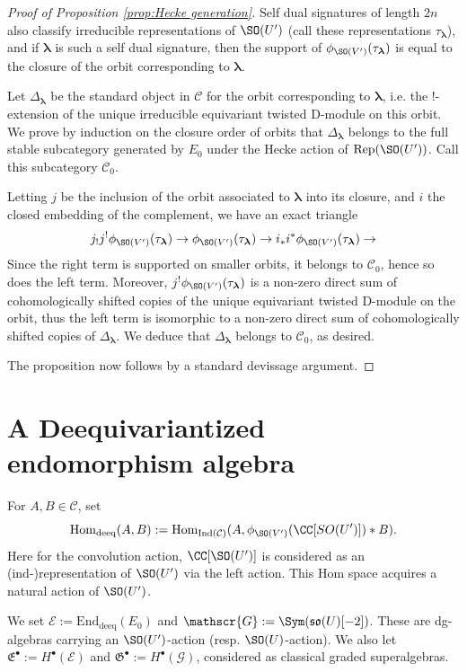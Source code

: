 \documentclass[11pt]{article}
\begin{document}
\begin{proof}[Proof of Proposition \ref{prop:Hecke generation}]
    Self dual signatures of length $2n$ also classify irreducible representations of $\SO(U')$ (call these representations $\tau_{\boldsymbol{\lambda}}$), and if $\boldsymbol{\lambda}$ is such a self dual signature, then the support of $\phi_{\SO(V')}(\tau_{\boldsymbol{\lambda}})$ is equal to the closure of the orbit corresponding to $\boldsymbol{\lambda}$.
    
    Let $\Delta_{\boldsymbol{\lambda}}$ be the standard object in $\mathcal{C}$ for the orbit corresponding to $\boldsymbol{\lambda}$, i.e. the $!$-extension of the unique irreducible equivariant twisted D-module on this orbit. We prove by induction on the closure order of orbits that $\Delta_{\boldsymbol{\lambda}}$ belongs to the full stable subcategory generated by $E_0$ under the Hecke action of $\mathrm{Rep}(\SO(U'))$. Call this subcategory $\mathcal{C}_0$.

    Letting $j$ be the inclusion of the orbit associated to $\boldsymbol{\lambda}$ into its closure, and $i$ the closed embedding of the complement, we have an exact triangle
    $$j_! j^! \phi_{\SO(V')}(\tau_{\boldsymbol{\lambda}}) \to \phi_{\SO(V')}(\tau_{\boldsymbol{\lambda}}) \to i_* i^* \phi_{\SO(V')}(\tau_{\boldsymbol{\lambda}})\to$$
    Since the right term is supported on smaller orbits, it belongs to $\mathcal{C}_0$, hence so does the left term.
    Moreover, $j^! \phi_{\SO(V')}(\tau_{\boldsymbol{\lambda}})$ is a non-zero direct sum of cohomologically shifted copies of the unique equivariant twisted D-module on the orbit, thus the left term is isomorphic to a non-zero direct sum of cohomologically shifted copies of $\Delta_{\boldsymbol{\lambda}}$. We deduce that $\Delta_{\boldsymbol{\lambda}}$ belongs to $\mathcal{C}_0$, as desired.

    The proposition now follows by a standard devissage argument.
\end{proof}

\section{A Deequivariantized endomorphism algebra}\label{sec: deeq}
\begin{definition}\label{def: deeq}
    For $A,B\in \mathcal{C}$, set
    $$\mathrm{Hom}_{\mathrm{deeq}}(A,B):=\mathrm{Hom}_{\mathrm{Ind}(\mathcal{C})}(A, \phi_{\SO(V')}(\CC[SO(U')])*B).$$
Here for the convolution action, $\CC[\SO(U')]$ is considered as an (ind-)representation of $\SO(U')$ via the left action. This Hom space acquires a natural action of $\SO(U')$.
\end{definition}
We set $\mathscr{E}:=\mathrm{End}_{\mathrm{deeq}}(E_0)$ and $\mathscr{G}:=\Sym(\mathfrak{so}(U)[-2])$.
These are dg-algebras carrying an $\SO(U')$-action (resp. $\SO(U)$-action).
We also let $\mathfrak{E}^\bullet:=H^\bullet(\mathscr{E})$ and $\mathfrak{G}^\bullet:=H^\bullet(\mathscr{G})$, considered as classical graded superalgebras.
\end{document}
